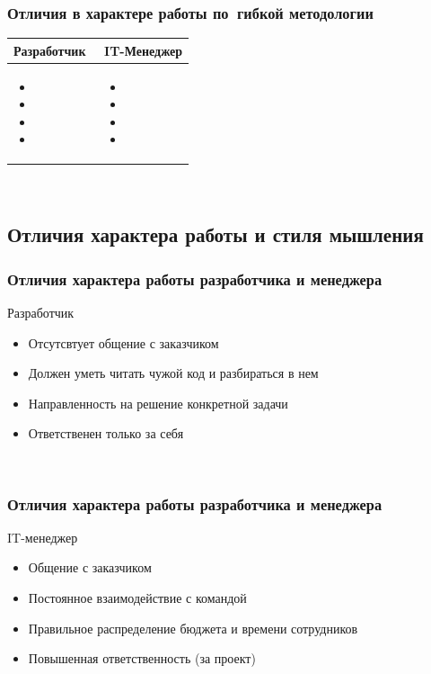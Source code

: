 \documentclass{../industrial-development}
\begin{document}
\begin{frame} \frametitle{Отличия в характере работы по~гибкой методологии}

	 	\begin{table}[R]

\begin{center}
\begin{tabular}{|p{0.5\linewidth}|p{0.5\linewidth}|}
\hline
\textbf{Разработчик} & \textbf{IT-Менеджер} \\
\hline
\begin{itemize}
\item 
\item 
\item 
\item 
\end{itemize}
 & 
\begin{itemize}
\item 
\item 
\item
\item
\end{itemize} \\
\hline
\end{tabular}
\end{center}
\end{table} 
\end{frame}
\lecturenotes
~\cite{How_to_be_a_good_IT-manager}

\subsection{Отличия характера работы и стиля мышления}
\begin{frame} \frametitle{Отличия характера работы разработчика и менеджера}
	\begin{block}{Разработчик}
\begin{itemize}
\item Отсутсвтует общение с заказчиком
\item Должен уметь читать чужой код и разбираться в нем
\item Направленность на решение конкретной задачи
\item Ответственен только за себя
\end{itemize}
\end{block}
\end{frame}
\lecturenotes

~\cite{How_to_be_a_good_IT-manager}

\begin{frame} \frametitle{Отличия характера работы разработчика и менеджера}
	\begin{block}{IT-менеджер}
\begin{itemize}
\item Общение с заказчиком
\item Постоянное взаимодействие с командой
\item Правильное распределение бюджета и времени сотрудников
\item Повышенная ответственность (за проект)
\end{itemize}
\end{block}
\end{frame}
\lecturenotes
\end{document}
